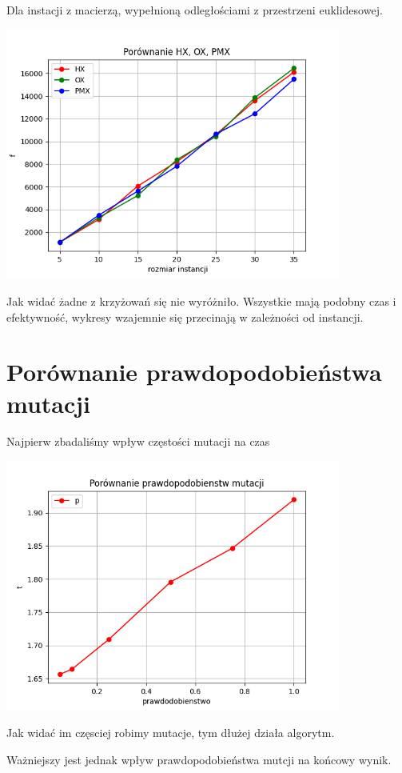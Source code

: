 \documentclass{article}
\begin{document}
    Dla instacji z macierzą, wypełnioną odległościami z przestrzeni
    euklidesowej.

    \includegraphics[width=11cm]{../spr3img/Figure_3.png}

   Jak widać żadne z krzyżowań się nie wyróżniło. Wszystkie mają podobny
   czas i efektywność, wykresy wzajemnie się przecinają w zależności od
   instancji.

    \section{Porównanie prawdopodobieństwa mutacji}

    Najpierw zbadaliśmy wpływ częstości mutacji na czas

    \includegraphics[width=11cm]{../spr3img/Figure_5.png}

    Jak widać im częsciej robimy mutacje, tym dłużej działa algorytm.

    Ważniejszy jest jednak wpływ prawdopodobieństwa mutcji na końcowy wynik.
\end{document}
